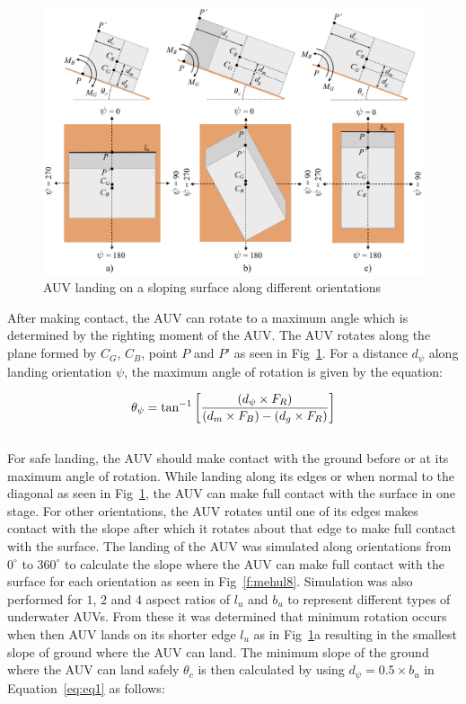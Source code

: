 \begin{figure}[!ht]
\centering
\includegraphics[width=\textwidth]{./images/mehul7.png}
\caption{AUV landing on a sloping surface along different orientations}
\label{f:mehul7}
\end{figure}

After making contact, the AUV can rotate to a maximum angle which is determined by the righting moment of the AUV. The AUV rotates along the plane formed by $C_G$, $C_B$, point $P$ and $P$' as seen in Fig~\ref{f:mehul7}. For a distance $d_{\psi}$ along landing orientation $\psi$, the maximum angle of rotation is given by the equation:

\begin{equation}
\label{eq:eq1}
\centering
	\theta_\psi = \tan^{-1}\left[ \frac{(d_{\psi} \times F_R)}{(d_m \times F_B) - (d_g \times F_R)}\right]
\end{equation}\\

For safe landing, the AUV should make contact with the ground before or at its maximum angle of rotation. While landing along its edges or when normal to the diagonal as seen in Fig~\ref{f:mehul7}, the AUV can make full contact with the surface in one stage. For other orientations, the AUV rotates until one of its edges makes contact with the slope after which it rotates about that edge to make full contact with the surface. The landing of the AUV was simulated along  orientations from $0^\circ$ to  $360^\circ$ to calculate the slope where the AUV can make full contact with the surface for each orientation as seen in Fig~\ref{f:mehul8}. Simulation was also performed for $1$, $2$ and $4$ aspect ratios of $l_u$ and $b_u$ to represent different types of underwater AUVs. From these it was determined that minimum rotation occurs when then AUV lands on its shorter edge $l_u$ as in Fig~\ref{f:mehul7}a resulting in the smallest slope of ground where the AUV can land. The minimum slope of the ground where the AUV can land safely $\theta_c$ is then calculated by using $d_{\psi} = 0.5 \times b_u$ in Equation~\ref{eq:eq1} as follows:

